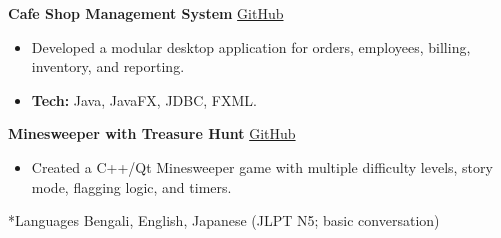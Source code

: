 \documentclass[10pt,a4paper]{article}
\makeatletter
\renewcommand\section{\@startsection{section}{1}{0pt}{8pt}{3pt}{\large\bfseries\color{deepblue}}}
\makeatother
\begin{document}
\textbf{Cafe Shop Management System} \hfill \href{https://github.com/Flamy-A/Cafe-Management-System}{GitHub}
\begin{itemize}
  \item Developed a modular desktop application for orders, employees, billing, inventory, and reporting.
  \item \textbf{Tech:} Java, JavaFX, JDBC, FXML.
\end{itemize}

\textbf{Minesweeper with Treasure Hunt} \hfill \href{https://github.com/TanzilaKhan1/Project_minesweeper_with_treasure_hunt}{GitHub}
\begin{itemize}
  \item Created a C++/Qt Minesweeper game with multiple difficulty levels, story mode, flagging logic, and timers.
\end{itemize}

\section*{Languages}
Bengali, English, Japanese (JLPT N5; basic conversation)
\end{document}
